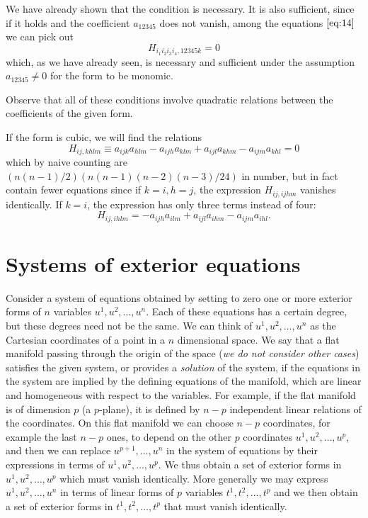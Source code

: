 \documentclass[leqno,11pt]{book}
\numberwithin{equation}{chapter}
\theoremstyle{shape1}
\theoremstyle{shape0}
\theoremstyle{shape2}
\theoremstyle{definition}
\begin{document}
We have already shown that the condition is necessary. It is also sufficient, since if it holds and the coefficient $a_{12345}$ does not vanish, among the equations $\eqref{eq:14}$ we can pick out 
\[
H_{i_{1}i_{2}i_{3}i_{4},12345k}=0
\]
which, as we have already seen, is necessary and sufficient under the assumption $a_{12345}\neq 0$ for the form to be monomic.

Observe that all of these conditions involve quadratic relations between the coefficients of the given form.

If the form is cubic, we will find the relations
\[
H_{ij,khlm}\equiv a_{ijk}a_{hlm}-a_{ijh}a_{klm}+a_{ijl}a_{khm}-a_{ijm}a_{khl}=0
\]
which by naive counting are $(n(n-1)/2)(n(n-1)(n-2)(n-3)/24)$ in number, but in fact contain fewer equations since if $k=i,h=j$, the expression $H_{ij,ijhm}$ vanishes identically. If $k=i$, the expression has only three terms instead of four:
\[
H_{ij,ihlm}=-a_{ijh}a_{ilm}+a_{ijl}a_{ihm}-a_{ijm}a_{ihl}.
\]

\section{Systems of exterior equations}
\label{sec:syst-exter-equat}
\fsec Consider a system of equations obtained by setting to zero one or more exterior forms of $n$ variables $u^{1},u^{2},\dots,u^{n}$. Each of these equations has a certain degree, but these degrees need not be the same. We can think of $u^{1},u^{2},\dots,u^{n}$ as the Cartesian coordinates of a point in a $n$ dimensional space. We say that a flat manifold passing through the origin of the space (\emph{we do not consider other cases}) satisfies the given system, or provides a \emph{solution} of the system, if the equations in the system are implied by the defining equations of the manifold, which are linear and homogeneous with respect to the variables. For example, if the flat manifold is of dimension $p$ (a $p$-plane), it is defined by $n-p$ independent linear relations of the coordinates. On this flat manifold we can choose $n-p$ coordinates, for example the last $n-p$ ones, to depend on the other $p$ coordinates $u^{1},u^{2},\dots,u^{p}$, and then we can replace $u^{p+1},\dots,u^{n}$ in the system of equations by their expressions in terms of $u^{1},u^{2},\dots,u^{p}$. We thus obtain a set of exterior forms in $u^{1},u^{2},\dots,u^{p}$ which must vanish identically. More generally we may express $u^{1},u^{2},\dots,u^{n}$ in terms of linear forms of $p$ variables $t^{1},t^{2},\dots,t^{p}$ and we then obtain a set of exterior forms in $t^{1},t^{2},\dots,t^{p}$ that must vanish identically.
\end{document}
